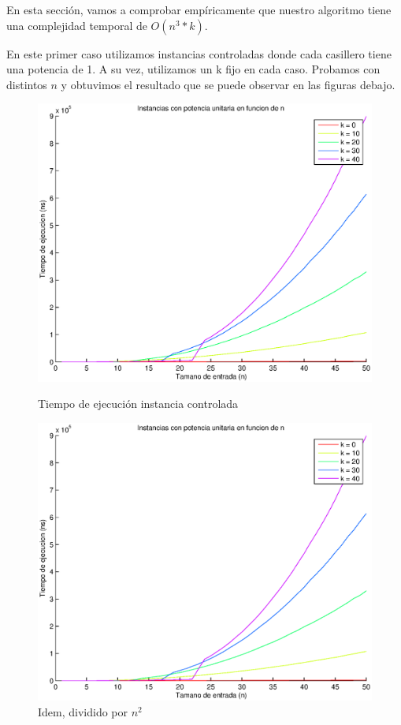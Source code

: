 En esta sección, vamos a comprobar empíricamente que nuestro algoritmo tiene una complejidad temporal de $O(n^3*k)$.

En este primer caso utilizamos instancias controladas donde cada casillero tiene una potencia de 1. A su vez, utilizamos un k fijo en cada caso. Probamos con distintos $n$ y obtuvimos el resultado que se puede observar en las figuras debajo.

\begin{figure}[H]
  \begin{minipage}{0.5\linewidth}
    \includegraphics[width=\linewidth]{img/problema3/instancia_p_1_varios_k.eps}
    \caption{Tiempo de ejecución instancia controlada}\label{fig:problema3-k}
  \end{minipage}
  \hfill
  \begin{minipage}{0.5\linewidth}
    \includegraphics[width=\linewidth]{img/problema3/instancia_p_1_varios_k_div_n2.eps}
    \caption{Idem, dividido por $n^2$}\label{fig:problema3-k-n2}
  \end{minipage}
\end{figure}

